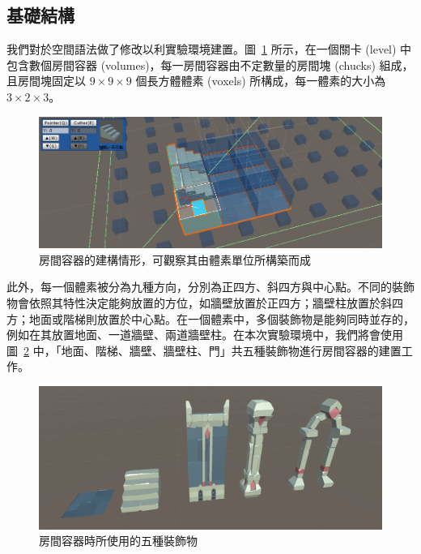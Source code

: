 \subsection{基礎結構}
\label{ssec:method-spacepieces-basic}

我們對於空間語法做了修改以利實驗環境建置。圖~\ref{fig:spacepieces-structure} 所示，在一個關卡 (level) 中包含數個房間容器 (volumes)，每一房間容器由不定數量的房間塊 (chucks) 組成，且房間塊固定以 $9\times 9\times 9$ 個長方體體素 (voxels) 所構成，每一體素的大小為 $3\times 2\times 3$。

\begin{figure}[ht]
  \begin{center}
    \includegraphics[width=1.0\textwidth]{figures/spacepieces-structure.png}
    \caption{房間容器的建構情形，可觀察其由體素單位所構築而成}
    \label{fig:spacepieces-structure}
  \end{center}
\end{figure}

此外，每一個體素被分為九種方向，分別為正四方、斜四方與中心點。不同的裝飾物會依照其特性決定能夠放置的方位，如牆壁放置於正四方；牆壁柱放置於斜四方；地面或階梯則放置於中心點。在一個體素中，多個裝飾物是能夠同時並存的，例如在其放置地面、一道牆壁、兩道牆壁柱。在本次實驗環境中，我們將會使用圖~\ref{fig:decorations-with-directions} 中，「地面、階梯、牆壁、牆壁柱、門」共五種裝飾物進行房間容器的建置工作。

\begin{figure}[ht]
  \begin{center}
    \includegraphics[width=1.0\textwidth]{figures/decorations-with-directions.png}
    \caption{房間容器時所使用的五種裝飾物}
    \label{fig:decorations-with-directions}
  \end{center}
\end{figure}

